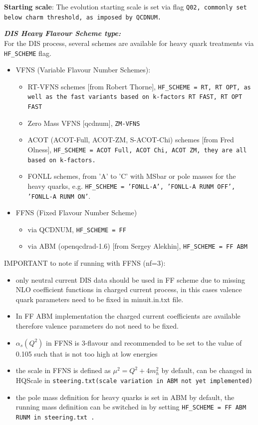 \begin{description}
\begin{description}
\item {\bf Starting scale}: 
The evolution starting scale is set via flag  \tt{Q02}\rm, commonly set below charm threshold, as imposed by QCDNUM.

\item {\it\bf DIS Heavy Flavour Scheme type:} \\
For the DIS process, several schemes are available for heavy quark treatments via  {\tt HF\_SCHEME} flag.
\begin{itemize}
  \item VFNS (Variable Flavour Number Schemes):
    \begin{itemize}
     \item RT-VFNS  schemes                               [from Robert Thorne], \tt{HF\_SCHEME = RT, RT OPT}\rm, as well as the fast variants based on k-factors \tt{RT FAST, RT OPT FAST}
     \item Zero Mass VFNS                                 [qcdnum], \tt{ZM-VFNS}\rm   
     \item  ACOT (ACOT-Full, ACOT-ZM, S-ACOT-Chi) schemes  [from Fred Olness], \tt{HF\_SCHEME = ACOT Full, ACOT Chi, ACOT ZM}\rm, they are all based on k-factors. 
     \item FONLL schemes, from 'A' to 'C' with MSbar or pole masses for the heavy quarks, e.g. 
     {\tt HF\_SCHEME = 'FONLL-A', 'FONLL-A RUNM OFF', 'FONLL-A RUNM ON'}.
    \end{itemize}
    \item FFNS (Fixed Flavour Number Scheme)
    \begin{itemize}
    \item via QCDNUM, \tt{HF\_SCHEME = FF}\rm 
    \item via ABM (openqcdrad-1.6)   [from Sergey Alekhin], \tt{HF\_SCHEME = FF ABM}\rm
    \end{itemize}
\end{itemize}
IMPORTANT to note if running with FFNS (nf=3): 
\begin{itemize}
  \item only neutral current DIS data should be used in FF scheme due to missing NLO 
    coefficient functions in charged current process, in this cases valence quark parameters  
    need to be fixed in minuit.in.txt file.
  \item In FF ABM implementation the charged current coefficients are available
    therefore valence parameters do not need to be fixed.
  \item $\alpha_s(Q^2)$ in FFNS is 3-flavour and recommended to be set to the value of 0.105 
    such that is not too high at low energies
  \item the scale in FFNS is defined as $\mu^2 = Q^2 + 4m_h^2$ by default, can be 
    changed in HQScale in \tt{steering.txt}\rm (scale variation in ABM not yet implemented)
  \item  the pole mass definition for heavy quarks is set in ABM by default, 
    the running mass definition \cite{Alekhin:runm} can be switched in 
    by setting \tt{HF\_SCHEME = FF ABM RUNM} \rm in \tt{steering.txt} \rm. 
\end{itemize}


\end{description}
\end{description}
